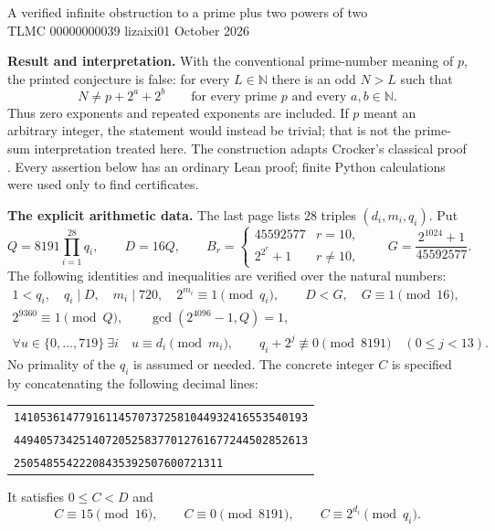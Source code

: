 \documentclass[10pt,a4paper]{article}
\newcommand{\N}{\mathbb N}
\newcommand{\F}[1]{2^{2^{#1}}+1}
\begin{document}
\begin{center}
{\Large A verified infinite obstruction to a prime plus two powers of two}\\[4pt]
TLMC 00000000039 \quad lizaixi01  October 2026
\end{center}

\textbf{Result and interpretation.}
With the conventional prime-number meaning of $p$, the printed conjecture is false:
for every $L\in\N$ there is an odd $N>L$ such that
\[
 N\ne p+2^a+2^b\qquad
 \text{for every prime }p\text{ and every }a,b\in\N.
\]
Thus zero exponents and repeated exponents are included. If $p$ meant an arbitrary integer,
the statement would instead be trivial; that is not the prime-sum interpretation treated here.
The construction adapts Crocker's classical proof \cite{crocker}. Every assertion below has an
ordinary Lean proof; finite Python calculations were used only to find certificates.

\textbf{The explicit arithmetic data.}
The last page lists $28$ triples $(d_i,m_i,q_i)$. Put
\[
 Q=8191\prod_{i=1}^{28}q_i,\qquad D=16Q,\qquad
 B_r=\begin{cases}45592577&r=10,\\ \F r&r\ne10,\end{cases}
 \qquad G=\frac{2^{1024}+1}{45592577}.
\]
The following identities and inequalities are verified over the natural numbers:
\begin{gather*}
 1<q_i,\quad q_i\mid D,\quad m_i\mid720,\quad 2^{m_i}\equiv1\pmod{q_i},\qquad D<G,\quad G\equiv1\pmod{16},\\
 2^{9360}\equiv1\pmod Q,\qquad \gcd(2^{4096}-1,Q)=1,\\
 \forall u\in\{0,\ldots,719\}\ \exists i\quad u\equiv d_i\pmod{m_i},\qquad
 q_i+2^j\not\equiv0\pmod{8191}\quad(0\le j<13).
\end{gather*}
No primality of the $q_i$ is assumed or needed. The concrete integer $C$ is specified by
concatenating the following decimal lines:
\begin{center}\begin{tabular}{l}
\texttt{141053614779161145707372581044932416553540193}\\
\texttt{449405734251407205258377012761677244502852613}\\
\texttt{25054855422208435392507600721311}
\end{tabular}\end{center}
It satisfies $0\le C<D$ and
\[
 C\equiv15\pmod{16},\qquad C\equiv0\pmod{8191},\qquad
 C\equiv2^{d_i}\pmod{q_i}.
\]
\end{document}
